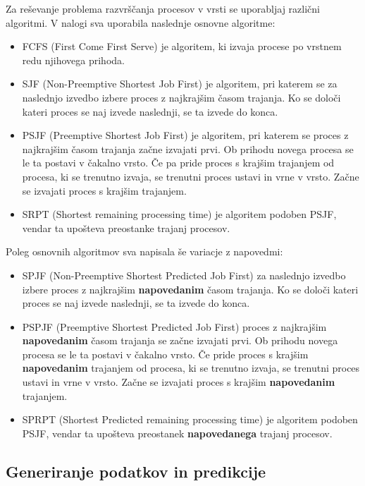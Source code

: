 \documentclass[a4paper, pt14]{article}
\begin{document}
Za reševanje problema razvrščanja procesov v vrsti se uporabljaj različni algoritmi. V nalogi sva uporabila naslednje osnovne algoritme:
\begin{itemize}
  \item FCFS (First Come First Serve) je algoritem, ki izvaja procese po vrstnem redu njihovega prihoda.
  \item SJF (Non-Preemptive Shortest Job First) je algoritem, pri katerem se za naslednjo izvedbo izbere proces z najkrajšim časom trajanja. Ko se določi kateri proces se naj izvede naslednji, se ta izvede do konca. 
  \item PSJF (Preemptive Shortest Job First) je algoritem, pri katerem se proces z najkrajšim časom trajanja začne izvajati prvi. Ob prihodu novega procesa se le ta postavi v čakalno vrsto. Če pa pride proces s krajšim trajanjem od procesa, ki se trenutno izvaja, se trenutni proces ustavi in vrne v vrsto. Začne se izvajati proces s krajšim trajanjem.
  \item SRPT (Shortest remaining processing time) je algoritem podoben PSJF, vendar ta upošteva preostanke trajanj procesov.
\end{itemize}

Poleg osnovnih algoritmov sva napisala še variacje z napovedmi:

\begin{itemize}
  \item SPJF (Non-Preemptive Shortest Predicted Job First) za naslednjo izvedbo izbere proces z najkrajšim \textbf{napovedanim} časom trajanja. Ko se določi kateri proces se naj izvede naslednji, se ta izvede do konca. 
  \item PSPJF (Preemptive Shortest Predicted Job First) proces z najkrajšim \textbf{napovedanim} časom trajanja se začne izvajati prvi. Ob prihodu novega procesa se le ta postavi v čakalno vrsto. Če pride proces s krajšim \textbf{napovedanim} trajanjem od procesa, ki se trenutno izvaja, se trenutni proces ustavi in vrne v vrsto. Začne se izvajati proces s krajšim \textbf{napovedanim} trajanjem.
  \item SPRPT (Shortest Predicted remaining processing time) je algoritem podoben PSJF, vendar ta upošteva preostanek \textbf{napovedanega} trajanj procesov.
\end{itemize}



\subsection{Generiranje podatkov in predikcije}
\end{document}
